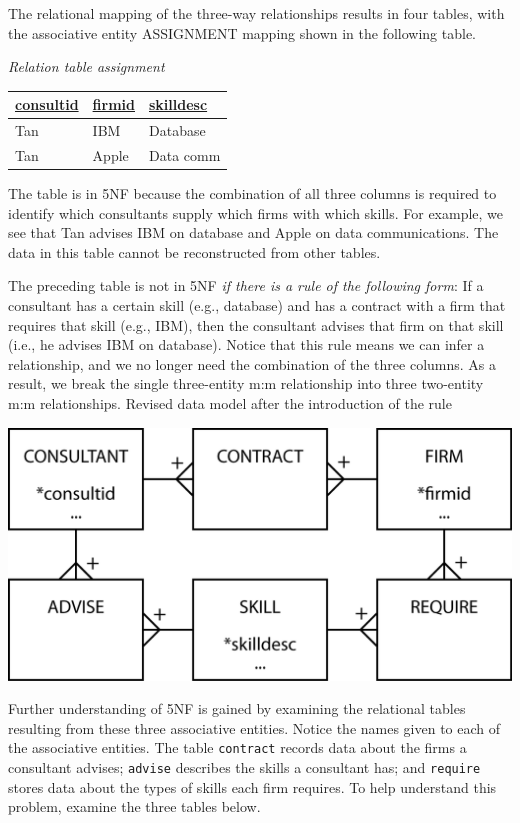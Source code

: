 \documentclass[
]{article}
\begin{document}
The relational mapping of the three-way relationships results in four
tables, with the associative entity ASSIGNMENT mapping shown in the
following table.

\emph{Relation table assignment}

\begin{longtable}[]{@{}lll@{}}
\toprule
\underline{consultid} & \underline{firmid} & \underline{skilldesc} \\
\midrule
\endhead
Tan & IBM & Database \\
Tan & Apple & Data comm \\
\bottomrule
\end{longtable}

The table is in 5NF because the combination of all three columns is
required to identify which consultants supply which firms with which
skills. For example, we see that Tan advises IBM on database and Apple
on data communications. The data in this table cannot be reconstructed
from other tables.

The preceding table is not in 5NF \emph{if there is a rule of the following
form}: If a consultant has a certain skill (e.g., database) and has a
contract with a firm that requires that skill (e.g., IBM), then the
consultant advises that firm on that skill (i.e., he advises IBM on
database). Notice that this rule means we can infer a relationship, and
we no longer need the combination of the three columns. As a result, we
break the single three-entity m:m relationship into three two-entity m:m
relationships. Revised data model after the introduction of the rule

\includegraphics[width=6.25in,height=\textheight]{Figures/Chapter 8/5NF-2.png}

Further understanding of 5NF is gained by examining the relational
tables resulting from these three associative entities. Notice the names
given to each of the associative entities. The table \texttt{contract} records
data about the firms a consultant advises; \texttt{advise} describes the skills
a consultant has; and \texttt{require} stores data about the types of skills
each firm requires. To help understand this problem, examine the three
tables below.
\end{document}
